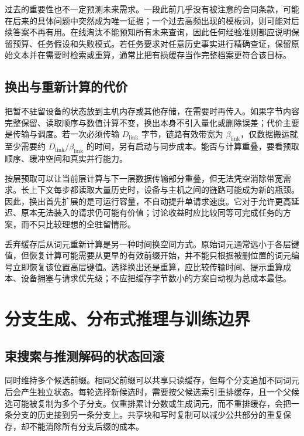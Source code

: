 \documentclass[UTF8,12pt,a4paper,fontset=fandol]{ctexart}
\begin{document}
过去的重要性也不一定预测未来需求。一段此前几乎没有被注意的合同条款，可能在后来的具体问题中突然成为唯一证据；一个过去高频出现的模板词，则可能对后续答案不再有用。在线淘汰不能预知所有未来查询，因此任何经验准则都应说明保留预算、任务假设和失败模式。若任务要求对任意历史事实进行精确查证，保留原始文本并在需要时检索或重算，通常比把有损缓存当作完整档案更符合该目标。

\subsection{换出与重新计算的代价}

把暂不驻留设备的状态放到主机内存或其他存储，在需要时再传入。如果字节内容完整保留、读取顺序与数值计算不变，换出本身不引入量化或删除误差；代价主要是传输与调度。若一次必须传输 $D_{\mathrm{link}}$ 字节，链路有效带宽为 $\beta_{\mathrm{link}}$，仅数据搬运就至少需要约 $D_{\mathrm{link}}/\beta_{\mathrm{link}}$ 的时间，另有启动与同步成本。能否与计算重叠，要看预取顺序、缓冲空间和真实并行能力。

按层预取可以让当前层计算与下一层数据传输部分重叠，但无法凭空消除带宽需求。长上下文每步都读取大量历史时，设备与主机之间的链路可能成为新的瓶颈。因此，换出首先扩展的是可运行容量，不自动提升单请求速度。它对于允许更高延迟、原本无法装入的请求仍可能有价值；讨论收益时应比较同等可完成任务的方案，而不只比较理想的全驻留情形。

丢弃缓存后从词元重新计算是另一种时间换空间方式。原始词元通常远小于各层键值，但恢复计算可能需要从更早的有效前缀开始，并不能只根据被删位置的词元编号立即恢复该位置高层键值。选择换出还是重算，应比较传输时间、提示重算成本、设备拥塞与请求优先级；不应把缓存字节数小的方案自动视为总成本最低。

\section{分支生成、分布式推理与训练边界}
\label{sec:kv-extensions}

\subsection{束搜索与推测解码的状态回滚}

同时维持多个候选前缀。相同父前缀可以共享只读缓存，但每个分支追加不同词元后会产生独立状态。每轮选择新候选时，需要按父候选索引重排缓存，且一个父候选可能被复制为多个子分支。仅重排累计分数或生成词元，而不重排缓存，会把一条分支的历史接到另一条分支上。共享块和写时复制可以减少公共部分的重复保存，却不能消除所有分支后缀的成本。
\end{document}
